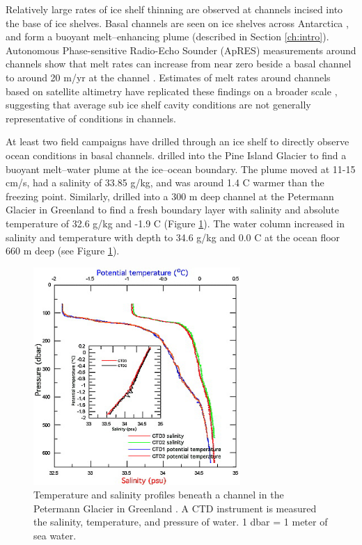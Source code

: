 Relatively large rates of ice shelf thinning are observed at channels incised into the base of ice shelves. Basal channels are seen on ice shelves across Antarctica \citep{alley2016impacts}, and form a buoyant melt--enhancing plume (described in Section \ref{ch:intro}). Autonomous Phase-sensitive Radio-Echo Sounder (ApRES) measurements around channels show that melt rates can increase from near zero beside a basal channel to around 20 m/yr at the channel \citep{stanton2013channelized, marsh2016high}. Estimates of melt rates around channels based on satellite altimetry have replicated these findings on a broader scale \cite[e.g][]{chartrand2020basal,rignot2008channelized},
suggesting that average sub ice shelf cavity conditions are not generally representative of conditions in channels. 

At least two field campaigns have drilled through an ice shelf to directly observe ocean conditions in basal channels.
\cite{stanton2013channelized} drilled into the Pine Island Glacier to find a buoyant melt--water plume at the ice--ocean boundary. The plume moved at 11-15 cm/s, had a salinity of 33.85 g/kg, and was around 1.4 \textdegree C warmer than the freezing point. Similarly, \cite{rignot2008channelized} drilled into a 300 m deep channel at the Petermann Glacier in Greenland to find a fresh boundary layer with salinity and absolute temperature of  32.6 g/kg and -1.9 \textdegree C (Figure \ref{fig:oceanobs3}). The water column increased in salinity and temperature with depth to 34.6 g/kg and 0.0 \textdegree C at the ocean floor 660 m deep (see Figure \ref{fig:oceanobs3}).

\begin{figure}[!ht]
\centering
\includegraphics[width=0.7\textwidth]{chapters/4/oceanobs3.png}
\caption[]{Temperature and salinity profiles beneath a channel in the Petermann Glacier in Greenland \cite{rignot2008channelized}. A CTD instrument is measured the salinity, temperature, and pressure of water. 1 dbar = 1 meter of sea water.}
\label{fig:oceanobs3}
\end{figure}

